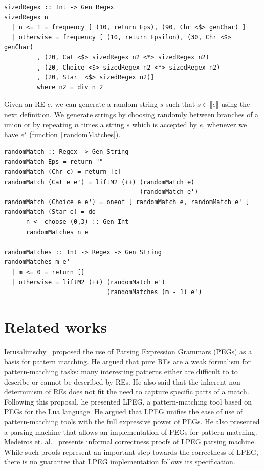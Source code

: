 \documentclass[review]{elsarticle}
\newcommand{\sembrackets}[1]{\ensuremath{\llbracket #1 \rrbracket}}
\newcommand{\haskell}[1]{\texttt|#1|}
\theoremstyle{definition}
\begin{document}
\begin{verbatim}
sizedRegex :: Int -> Gen Regex
sizedRegex n
  | n <= 1 = frequency [ (10, return Eps), (90, Chr <$> genChar) ]
  | otherwise = frequency [ (10, return Epsilon), (30, Chr <$> genChar)
         , (20, Cat <$> sizedRegex n2 <*> sizedRegex n2)
         , (20, Choice <$> sizedRegex n2 <*> sizedRegex n2)
         , (20, Star  <$> sizedRegex n2)]
         where n2 = div n 2
\end{verbatim}


Given an RE $e$, we can generate a random string $s$ such that $s \in\sembrackets{e}$
using the next definition. We generate strings by choosing randomly between branches of
a union or by repeating $n$ times a string $s$ which is accepted by $e$, whenever we
have $e^\star$ (function \haskell{randomMatches}).

\begin{verbatim}
randomMatch :: Regex -> Gen String
randomMatch Eps = return ""
randomMatch (Chr c) = return [c]
randomMatch (Cat e e') = liftM2 (++) (randomMatch e)
                                     (randomMatch e')
randomMatch (Choice e e') = oneof [ randomMatch e, randomMatch e' ]
randomMatch (Star e) = do
      n <- choose (0,3) :: Gen Int
      randomMatches n e

randomMatches :: Int -> Regex -> Gen String
randomMatches m e'
  | m <= 0 = return []
  | otherwise = liftM2 (++) (randomMatch e')
                            (randomMatches (m - 1) e')
\end{verbatim}

\section{Related works}\label{section:related}

Ierusalimschy~\cite{Ierusalimschy2009} proposed the use of Parsing Expression Grammars (PEGs) as a basis
for pattern matching. He argued that pure REs are a weak formalism for pattern-matching tasks:
many interesting patterns either are difficult to to describe or cannot be described by REs. He also said
that the inherent non-determinism of REs does not fit the need to capture specific parts of a match. Following
this proposal, he presented LPEG, a pattern-matching tool based on PEGs for the Lua language. He
argued that LPEG unifies the ease of use of pattern-matching tools with the full expressive power of PEGs.
He also presented a parsing machine that allows an implementation of PEGs for pattern matching.
Medeiros et. al.~\cite{Medeiros2008} presents informal correctness proofs of LPEG parsing machine.
While such proofs represent an important step towards the correctness of LPEG, there is no guarantee that LPEG
implementation follows its specification.
\end{document}
